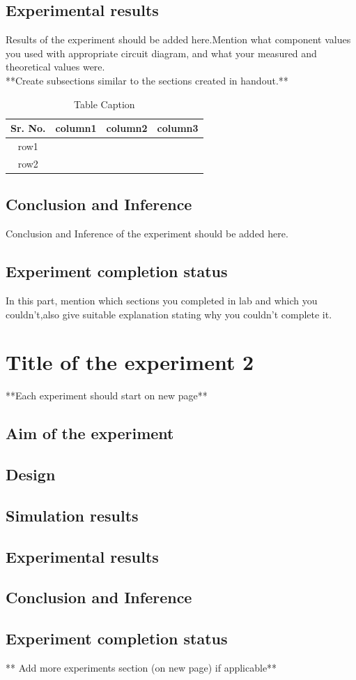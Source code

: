 \documentclass[12pt]{article}
\begin{document}
\subsection{Experimental results}

Results of the experiment should be added here.Mention what component values you used with appropriate circuit diagram, and what your measured and theoretical values were. \\

**Create subsections similar to the sections created in handout.**
\begin{table}[!hbt]
		\begin{center}
		\caption{Table Caption}
		\begin{tabular}{|c|c|c|c|}
			\hline
			Sr. No. & column1 & column2 & column3\\
			\hline
			row1 &  &  & \\
			\hline
			row2 &  &  & \\
			\hline
            
		\end{tabular}
		\end{center}
\end{table}

\subsection{Conclusion and Inference}
Conclusion and Inference of the experiment should be added here.


\subsection{Experiment completion status}
In this part, mention which sections you completed in lab and which you couldn't,also give suitable explanation stating why you couldn't complete it.

\newpage
\section{Title of the experiment 2}
**Each experiment should start on new page**
\subsection{Aim of the experiment}
\subsection{Design}
\subsection{Simulation results}
\subsection{Experimental results}
\subsection{Conclusion and Inference}
\subsection{Experiment completion status}

** Add more experiments section (on new page) if applicable**
\end{document}
